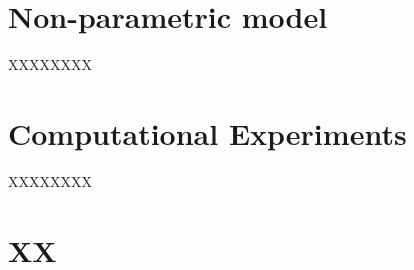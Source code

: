 \documentclass[a4paper]{IEEEtran}
\begin{document}





















\section{Non-parametric model}
XXXXXXXX


\section{Computational Experiments}
XXXXXXXX



\section{XX}
\end{document}
